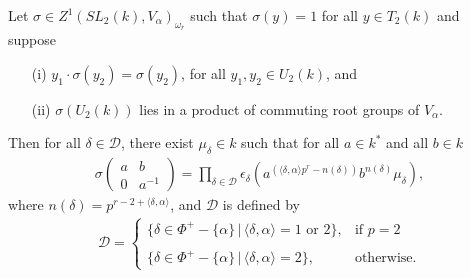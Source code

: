 \begin{lemma}\label{lem:second}
Let $\sigma\in Z^1(SL_2(k), V_\alpha)_{\omega_r}$ such that $\sigma(y) = 1$ for all $y\in T_2(k)$ and suppose
\begin{itemize}
	\item[(i)] $y_1 \cdot \sigma\left(y_2\right) = \sigma\left(y_2\right)$, for all $y_1,y_2 \in U_2(k)$, and
	\item[(ii)] $\sigma\left(U_2(k)\right)$ lies in a product of commuting root groups of $V_\alpha$.
\end{itemize}
Then for all $\delta \in \mathcal{D}$, there exist $\mu_\delta\in k$ such that for all $a\in k^*$ and all $b\in k$
\begin{align*}
\sigma\left(\begin{matrix}a & b\\0 & a^{-1}\end{matrix}\right) = \prod_{\delta\in\mathcal{D}} \epsilon_\delta\left(a^{(\langle\delta,\alpha\rangle p^r - n(\delta))}b^{n(\delta)}\mu_\delta\right),
\end{align*}
where $n(\delta) = p^{r-2+\langle\delta,\alpha\rangle}$, and $\mathcal{D}$ is defined by
\begin{align*}
	\mathcal{D} = \left\{ \begin{array}{ll}
		\{\delta \in \Phi^+ - \{\alpha\}\,|\, \langle \delta, \alpha \rangle = 1\textrm{ or }2\}, & \textrm{if } p = 2 \\ \\
		\{\delta \in \Phi^+ - \{\alpha\}\,|\, \langle \delta, \alpha \rangle = 2\}, & \textrm{otherwise}.
	\end{array}\right.
\end{align*}
\end{lemma}
